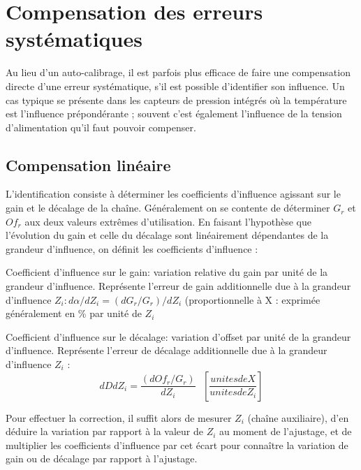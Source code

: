 \documentclass[main.tex]{subfiles}
\begin{document}
\section{Compensation des erreurs systématiques}

Au lieu d'un auto-calibrage, il est parfois plus efficace de faire une compensation directe d'une erreur systématique, s'il est possible d'identifier son influence. Un cas typique se présente dans les capteurs de pression intégrés où la température est l'influence prépondérante ; souvent c'est également l'influence de la tension d'alimentation qu'il faut pouvoir compenser.

\subsection{Compensation linéaire }
L'identification consiste à déterminer les coefficients d'influence agissant sur le gain et le décalage de la chaîne. Généralement on se contente de déterminer $G_r$ et $Of_r$ aux deux valeurs extrêmes d'utilisation. En faisant l'hypothèse que l'évolution du gain et celle du décalage sont linéairement dépendantes de la grandeur d'influence, on définit les coefficients d'influence :

\begin{definition}
   Coefficient d'influence sur le gain: variation relative du gain par unité de la grandeur d'influence. Représente l'erreur de gain additionnelle due à la grandeur d'influence $Z_i : d\alpha / dZ_i = (dG_r/G_r)/dZ_i$ (proportionnelle à X : exprimée généralement en \% par unité de $Z_i$

\end{definition}
\begin{definition}
	Coefficient d'influence sur le décalage: variation d'offset par unité de la grandeur d'influence. Représente l'erreur de décalage additionnelle due à la grandeur d'influence $Z_i$ : \\
            \begin{equation}
                {dD}{dZ_i} = \frac{(dOf_r/G_r)}{dZ_i}\text{ }[\frac{unites de X}{unites de Z_i}]
            \end{equation}

\end{definition}

Pour effectuer la correction, il suffit alors de mesurer $Z_i$ (chaîne auxiliaire), d'en déduire la variation par rapport à la valeur de $Z_i$ au moment de l'ajustage, et de multiplier les coefficients d'influence par cet écart pour connaître la variation de gain ou de décalage par rapport à l'ajustage.
\end{document}
